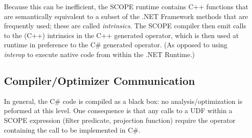 Because this can be inefficient, the SCOPE runtime contains C++ functions that are semantically equivalent to a subset of the .NET Framework methods that are frequently used; these are called {\it intrinsics}.
The SCOPE compiler then emit calls to the (C++) intrinsics in the C++ generated operator, which is then used at runtime in preference to the C\# generated operator.
(As opposed to using {\it interop} to execute native code from within the .NET Runtime.)

\subsection{Compiler/Optimizer Communication}
In general, the C\# code is compiled as a black box: no analysis/optimization is peformed at this level.
One consequence is that any calls to a
UDF within a SCOPE expression (filter predicate, projection function) require the operator containing
the call to be implemented in C\#.

